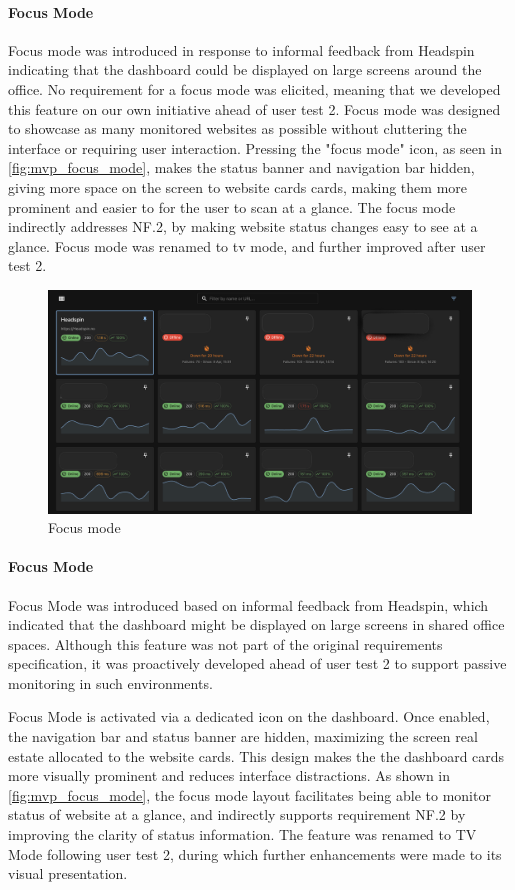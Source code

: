\paragraph{Focus Mode}
Focus mode was introduced in response to informal feedback from Headspin indicating that the dashboard could be displayed on large screens around the office. No requirement for a focus mode was elicited, meaning that we developed this feature on our own initiative ahead of user test 2. Focus mode was designed to showcase as many monitored websites as possible without cluttering the interface or requiring user interaction. Pressing the "focus mode" icon, as seen in \autoref{fig:mvp_focus_mode}, makes the status banner and navigation bar hidden, giving more space on the screen to website cards cards, making them more prominent and easier to for the user to scan at a glance. The focus mode indirectly addresses NF.2, by making website status changes easy to see at a glance. Focus mode was renamed to tv mode, and further improved after user test 2.

\begin{figure}[H]
    \centering
    \includegraphics[width=0.8\linewidth]{figures/MVP-dashboard/MVP-focus-mode.png}
    \caption{Focus mode}
    \label{fig:mvp_focus_mode}
\end{figure}

\paragraph{Focus Mode}

Focus Mode was introduced based on informal feedback from Headspin, which indicated that the dashboard might be displayed on large screens in shared office spaces. Although this feature was not part of the original requirements specification, it was proactively developed ahead of user test 2 to support passive monitoring in such environments.

Focus Mode is activated via a dedicated icon on the dashboard. Once enabled, the navigation bar and status banner are hidden, maximizing the screen real estate allocated to the website cards. This design makes the the dashboard cards more visually prominent and reduces interface distractions. As shown in \autoref{fig:mvp_focus_mode}, the focus mode layout  facilitates being able to monitor status of website at a glance, and indirectly supports requirement NF.2 by improving the clarity of status information. The feature was renamed to TV Mode following user test 2, during which further enhancements were made to its visual presentation.

